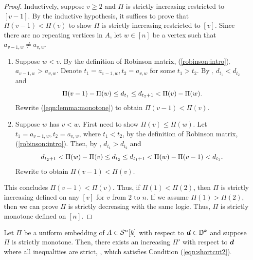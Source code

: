 \documentclass[runningheads]{llncs}
\begin{document}
\begin{proof}
Inductively, suppose $v\geq 2$ and $\Pi$ is strictly increasing restricted to $[v-1]$.
By the inductive hypothesis, it suffices to prove that $\Pi(v-1)<\Pi(v)$ to show $\Pi$ is strictly increasing restricted to $[v]$. 
Since there are no repeating vertices in $A$, let $w\in[n]$ be a vertex such that $a_{v-1, w}\neq a_{v,w}$.
\begin{enumerate}
    \item Suppose $w<v$. %
    By the definition of Robinson matrix, (\ref{robinson:intro}), $a_{v-1, w}>a_{v,w}$. Denote ${t_1} = a_{v-1,w}, {t_2} = a_{v,w}$ for some $t_1>t_2$. By , $d_{t_1}<d_{t_2}$ and
\begin{equation}\label{eqn:lemma:monotone}
\dist w{v-1} \leq d_{t_1} \leq d_{t_2+1}<\dist wv.
\end{equation} 
Rewrite (\ref{eqn:lemma:monotone}) to obtain $\Pi(v-1)<\Pi(v)$.
\item Suppose $w$ has $v<w$. 
First need to show $\Pi(v)\leq \Pi(w)$. 
Let ${t_1} = a_{v-1,w}, {t_2} = a_{v,w}$, where $t_1 < t_2$, by the definition of Robinson matrix, (\ref{robinson:intro}). 
Then, by , $d_{t_1}> d_{t_2}$ and 
\begin{equation}
        d_{t_2+1} < \dist{v}{w}\leq d_{t_2} \leq  d_{t_1+1} <\dist{v-1}{w}<d_{t_1}.
    \end{equation}
    Rewrite to obtain $\Pi(v-1)<\Pi(v)$.
\end{enumerate}
This concludes $\Pi(v-1)<\Pi(v)$. Thus, if $\Pi(1)<\Pi(2)$, then $\Pi$ is strictly increasing defined on any $[v]$ for $v$ from 2 to $n$.
If we assume $\Pi(1)>\Pi(2)$, then we can prove $\Pi$ is strictly decreasing with the same logic. 
Thus, $\Pi$ is strictly monotone defined on $[n]$.
\end{proof}


\begin{lemma}\label{lemma:strictly within}
Let $\Pi$ be a uniform embedding of $A\in\calS^n[k]$ with respect to $\bmd\in\bmD$ and suppose $\Pi$ is strictly monotone. 
Then, there exists an increasing $\Pi'$ with respect to $\bmd$ where all inequalities are strict, \ie, which satisfies Condition (\ref{eqn:shortcut2}).
\end{lemma}
% 
\end{document}
